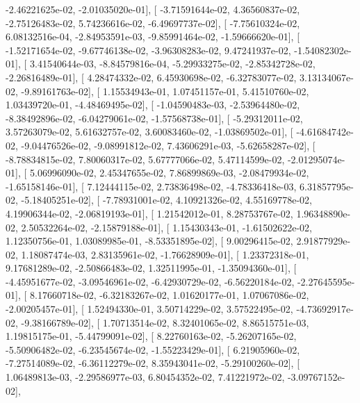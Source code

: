 \documentclass{article}
\begin{document}
         -2.46221625e-02,  -2.01035020e-01],
       [ -3.71591644e-02,   4.36560837e-02,  -2.75126483e-02,
          5.74236616e-02,  -6.49697737e-02],
       [ -7.75610324e-02,   6.08132516e-04,  -2.84953591e-03,
         -9.85991464e-02,  -1.59666620e-01],
       [ -1.52171654e-02,  -9.67746138e-02,  -3.96308283e-02,
          9.47241937e-02,  -1.54082302e-01],
       [  3.41540644e-03,  -8.84579816e-04,  -5.29933275e-02,
         -2.85342728e-02,  -2.26816489e-01],
       [  4.28474332e-02,   6.45930698e-02,  -6.32783077e-02,
          3.13134067e-02,  -9.89161763e-02],
       [  1.15534943e-01,   1.07451157e-01,   5.41510760e-02,
          1.03439720e-01,  -4.48469495e-02],
       [ -1.04590483e-03,  -2.53964480e-02,  -8.38492896e-02,
         -6.04279061e-02,  -1.57568738e-01],
       [ -5.29312011e-02,   3.57263079e-02,   5.61632757e-02,
          3.60083460e-02,  -1.03869502e-01],
       [ -4.61684742e-02,  -9.04476526e-02,  -9.08991812e-02,
          7.43606291e-03,  -5.62658287e-02],
       [ -8.78834815e-02,   7.80060317e-02,   5.67777066e-02,
          5.47114599e-02,  -2.01295074e-01],
       [  5.06996090e-02,   2.45347655e-02,   7.86899869e-03,
         -2.08479934e-02,  -1.65158146e-01],
       [  7.12444115e-02,   2.73836498e-02,  -4.78336418e-03,
          6.31857795e-02,  -5.18405251e-02],
       [ -7.78931001e-02,   4.10921326e-02,   4.55169778e-02,
          4.19906344e-02,  -2.06819193e-01],
       [  1.21542012e-01,   8.28753767e-02,   1.96348890e-02,
          2.50532264e-02,  -2.15879188e-01],
       [  1.15430343e-01,  -1.61502622e-02,   1.12350756e-01,
          1.03089985e-01,  -8.53351895e-02],
       [  9.00296415e-02,   2.91877929e-02,   1.18087474e-03,
          2.83135961e-02,  -1.76628909e-01],
       [  1.23372318e-01,   9.17681289e-02,  -2.50866483e-02,
          1.32511995e-01,  -1.35094360e-01],
       [ -4.45951677e-02,  -3.09546961e-02,  -6.42930729e-02,
         -6.56220184e-02,  -2.27645595e-01],
       [  8.17660718e-02,  -6.32183267e-02,   1.01620177e-01,
          1.07067086e-02,  -2.00205457e-01],
       [  1.52494330e-01,   3.50714229e-02,   3.57522495e-02,
         -4.73692917e-02,  -9.38166789e-02],
       [  1.70713514e-02,   8.32401065e-02,   8.86515751e-03,
          1.19815175e-01,  -5.44799091e-02],
       [  8.22760163e-02,  -5.26207165e-02,  -5.50906482e-02,
         -6.23545674e-02,  -1.55223429e-01],
       [  6.21905960e-02,  -7.27514089e-02,  -6.36112279e-02,
          8.35943041e-02,  -5.29100260e-02],
       [  1.06489813e-03,  -2.29586977e-03,   6.80454352e-02,
          7.41221972e-02,  -3.09767152e-02],
\end{document}
